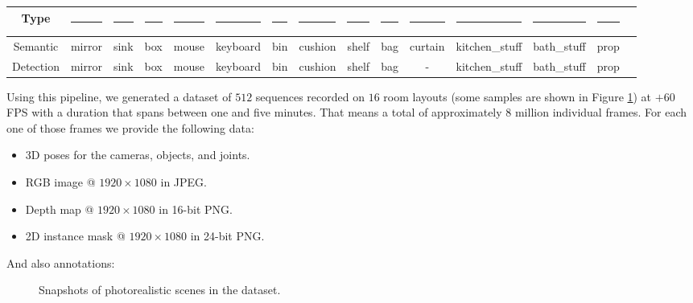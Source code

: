 \begin{table}[!tb]
{\begin{tabular}{|c|c|c|c|c|c|c|c|c|c|c|c|c|c|c|}
    \textbf{Type} & \textcolor{rgb26}{\rule{0.75cm}{0.25cm}}& \textcolor{rgb27}{\rule{0.75cm}{0.25cm}}& \textcolor{rgb28}{\rule{0.75cm}{0.25cm}}& \textcolor{rgb29}{\rule{0.75cm}{0.25cm}}& \textcolor{rgb30}{\rule{0.75cm}{0.25cm}}& \textcolor{rgb31}{\rule{0.75cm}{0.25cm}}& \textcolor{rgb32}{\rule{0.75cm}{0.25cm}}& \textcolor{rgb33}{\rule{0.75cm}{0.25cm}}& \textcolor{rgb34}{\rule{0.75cm}{0.25cm}}& \textcolor{rgb35}{\rule{0.75cm}{0.25cm}}& \textcolor{rgb36}{\rule{0.75cm}{0.25cm}}& \textcolor{rgb37}{\rule{0.75cm}{0.25cm}}& \textcolor{rgb38}{\rule{0.75cm}{0.25cm}}\\
    \hline
    Semantic & mirror & sink & box & mouse & keyboard & bin & cushion & shelf & bag & curtain & kitchen\_stuff & bath\_stuff & prop\\
    Detection & mirror & sink & box & mouse & keyboard & bin & cushion & shelf & bag & - & kitchen\_stuff & bath\_stuff & prop\\
    \hline
  \end{tabular}}
  \label{table:classes}
\end{table}

Using this pipeline, we generated a dataset of $512$ sequences recorded on $16$ room layouts (some samples are shown in Figure \ref{fig:scenes}) at $+60$ \ac{FPS} with a duration that spans between one and five minutes. That means a total of approximately $8$ million individual frames. For each one of those frames we provide the following data:

\begin{itemize}
  \item 3D poses for the cameras, objects, and joints.
  \item RGB image @ $1920\times1080$ in JPEG.
  \item Depth map @ $1920\times1080$ in 16-bit PNG.
  \item 2D instance mask @ $1920\times1080$ in 24-bit PNG.
\end{itemize}

And also annotations:

\begin{figure}[!tb]
  \centering
  \caption{Snapshots of photorealistic scenes in the dataset.}
  \label{fig:scenes}
\end{figure}

